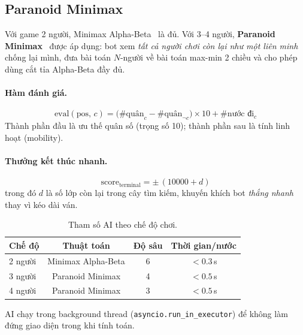\documentclass[12pt, a4paper]{article}
\begin{document}
\subsection{Paranoid Minimax}

Với game 2 người, Minimax Alpha-Beta~\cite{knuth1975alphabeta} là đủ.
Với 3--4 người, \textbf{Paranoid Minimax}~\cite{sturtevant2008analysis}
được áp dụng: bot xem \emph{tất cả người chơi còn lại như một liên minh}
chống lại mình, đưa bài toán $N$-người về bài toán max-min 2 chiều và cho
phép dùng cắt tỉa Alpha-Beta đầy đủ.

\paragraph{Hàm đánh giá.}
\begin{equation}
  \mathrm{eval}(\text{pos},\, c)
    = \bigl(\#\text{quân}_c - \#\text{quân}_{\neg c}\bigr) \times 10
      + \#\text{nước đi}_c
  \label{eq:eval}
\end{equation}
Thành phần đầu là ưu thế quân số (trọng số 10);
thành phần sau là tính linh hoạt (mobility).

\paragraph{Thưởng kết thúc nhanh.}
\begin{equation}
  \mathrm{score}_{\text{terminal}} = \pm\,(10000 + d)
\end{equation}
trong đó $d$ là số lớp còn lại trong cây tìm kiếm, khuyến khích bot
\emph{thắng nhanh} thay vì kéo dài ván.

\begin{table}[H]
  \centering
  \caption{Tham số AI theo chế độ chơi.}
  \label{tab:ai_params}
  \begin{tabular}{lccc}
    \toprule
    \textbf{Chế độ} & \textbf{Thuật toán} & \textbf{Độ sâu}
    & \textbf{Thời gian/nước} \\
    \midrule
    2 người & Minimax Alpha-Beta & 6 & $<0.3$\,s \\
    3 người & Paranoid Minimax   & 4 & $<0.5$\,s \\
    4 người & Paranoid Minimax   & 3 & $<0.5$\,s \\
    \bottomrule
  \end{tabular}
\end{table}

AI chạy trong background thread (\texttt{asyncio.run\_in\_executor})
để không làm đứng giao diện trong khi tính toán.
\end{document}
